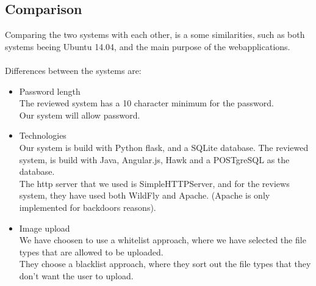 \subsection{Comparison}

Comparing the two systems with each other, is a some similarities, such as both systems beeing Ubuntu 14.04, and the main purpose of the webapplications. \\ \\
Differences between the systems are: \\

\begin{itemize} 
\item{Password length} \\
The reviewed system has a 10 character minimum for the password.\\
Our system will allow password.\\

\item{Technologies} \\
Our system is build with Python flask, and a SQLite database. The reviewed system, is build with Java, Angular.js, Hawk and a POSTgreSQL as the database.\\
The http server that we used is SimpleHTTPServer, and for the reviews system, they have used both WildFly and Apache. (Apache is only implemented for backdoors reasons).\\

\item{Image upload} \\
We have choosen to use a whitelist approach, where we have selected the file types that are allowed to be uploaded. \\
They choose a blacklist approach, where they sort out the file types that they don't want the user to upload.\\ 

\end{itemize}